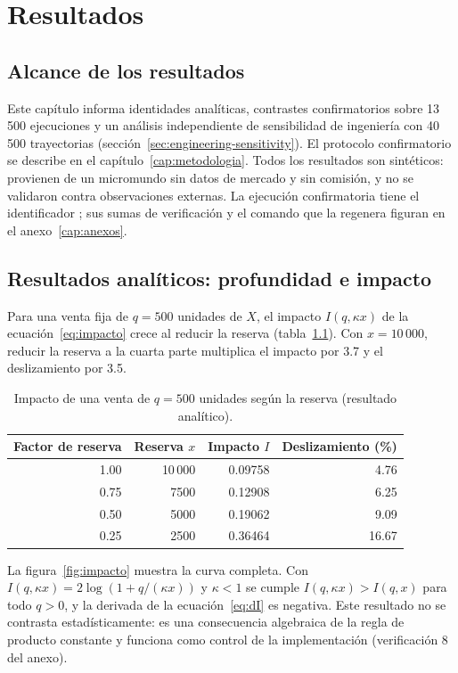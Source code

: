 \chapter{Resultados}
\label{cap:resultados}

\section{Alcance de los resultados}

Este capítulo informa identidades analíticas, contrastes confirmatorios sobre 13\,500 ejecuciones y un análisis independiente de sensibilidad de ingeniería con 40\,500 trayectorias (sección~\ref{sec:engineering-sensitivity}). El protocolo confirmatorio se describe en el capítulo~\ref{cap:metodologia}. Todos los resultados son sintéticos: provienen de un micromundo sin datos de mercado y sin comisión, y no se validaron contra observaciones externas. La ejecución confirmatoria tiene el identificador \code{\RunID}; sus sumas de verificación y el comando que la regenera figuran en el anexo~\ref{cap:anexos}.

\section{Resultados analíticos: profundidad e impacto}
\label{sec:res-analitico}

Para una venta fija de $q=500$ unidades de $X$, el impacto $I(q,\kappa x)$ de la ecuación~\eqref{eq:impacto} crece al reducir la reserva (tabla~\ref{tab:impacto}). Con $x=10\,000$, reducir la reserva a la cuarta parte multiplica el impacto por 3.7 y el deslizamiento por 3.5.

\begin{table}[htbp]
\centering
\caption{Impacto de una venta de $q=500$ unidades según la reserva (resultado analítico).}
\label{tab:impacto}
\small
\begin{tabular}{@{}rrrr@{}}
\toprule
Factor de reserva & Reserva $x$ & Impacto $I$ & Deslizamiento (\%) \\
\midrule
1.00 & 10\,000 & 0.09758 & 4.76 \\
0.75 & 7500 & 0.12908 & 6.25 \\
0.50 & 5000 & 0.19062 & 9.09 \\
0.25 & 2500 & 0.36464 & 16.67 \\
\bottomrule
\end{tabular}
\end{table}

La figura~\ref{fig:impacto} muestra la curva completa. Con $I(q,\kappa x)=2\log(1+q/(\kappa x))$ y $\kappa<1$ se cumple $I(q,\kappa x)>I(q,x)$ para todo $q>0$, y la derivada de la ecuación~\eqref{eq:dI} es negativa. Este resultado no se contrasta estadísticamente: es una consecuencia algebraica de la regla de producto constante y funciona como control de la implementación (verificación 8 del anexo).

